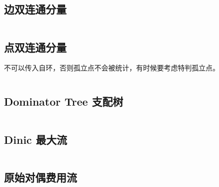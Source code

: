 \documentclass[titlepage, a4paper, 11pt]{article}
\begin{document}
\begin{spacing}{1.15}
				\subsection{边双连通分量}
					\inputminted{cpp}{src/TreeandGraph/EBCC.cpp}
				\subsection{点双连通分量}
					不可以传入自环，否则孤立点不会被统计，有时候要考虑特判孤立点。
					\inputminted{cpp}{src/TreeandGraph/VBCC.cpp}
				\subsection{Dominator Tree 支配树}
					\inputminted{cpp}{src/TreeandGraph/支配树.cpp}
				\subsection{Dinic 最大流}
					
					\inputminted[highlightlines={8,30}]{cpp}{src/TreeandGraph/Dinic.cpp}
				\subsection{原始对偶费用流}
					\inputminted[highlightlines={2,3,22,25,28,31,42,43}]{cpp}{src/TreeandGraph/多路增广费用流.cpp}

\end{spacing}
\end{document}

